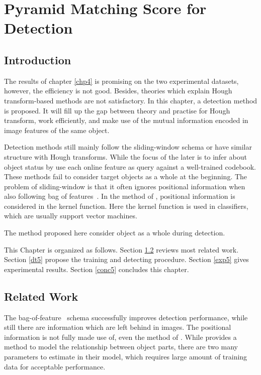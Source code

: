 \chapter{Pyramid Matching Score for Detection}
\label{chp5}

\section{Introduction}

The results of chapter \ref{chp4} is promising on the two experimental datasets, however, the efficiency is not good. Besides, theories which explain Hough transform-based methods are not satisfactory. In this chapter, a detection method is proposed. It will fill up the gap between theory and practise for Hough transform, work efficiently, and make use of the mutual information encoded in image features of the same object.

Detection methods still mainly follow the sliding-window schema or have similar structure with Hough transforms. While the focus of the later is to infer about object status by use each online feature as query against a well-trained codebook. These methods fail to consider target objects as a whole at the beginning. The problem of sliding-window is that it often ignores positional information when also following bag of features~\cite{bgf}. In the method of \cite{spmk}, positional information is considered in the kernel function. Here the kernel function\cite{kmts} is used in classifiers, which are usually support vector machines.

The method proposed here consider object as a whole during detection.


This Chapter is organized as follows. Section \ref{rw5} reviews most related work. Section \ref{dt5} propose the training and detecting procedure. Section \ref{exp5} gives experimental results. Section \ref{conc5} concludes this chapter.

\section{Related Work}
\label{rw5}
The bag-of-feature~\cite{bgf} schema successfully improves detection performance, while still there are information which are left behind in images. The positional information is not fully made use of, even the method of \cite{kmts}. While \cite{uspl} provides a method to model the relationship between object parts, there are two many parameters to estimate in their model, which requires large amount of training data for acceptable performance.

